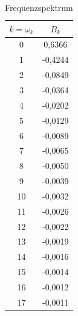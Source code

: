 \documentclass[titlepage = firstcover]{scrartcl}
\begin{document}
    \begin{table}[h]
        \centering
        \caption{Frequenzspektrum}
        \label{tab:Tabelle_2}
        
        \begin{tabular}{c c}
            \toprule
            {$k = \omega_k$} & {$B_k$}\\
            \midrule
            0 &  0,6366 \\
            1 & -0,4244 \\
            2 & -0,0849 \\
            3 & -0,0364 \\
            4 & -0,0202 \\
            5 & -0,0129 \\
            6 & -0,0089 \\
            7 & -0,0065 \\
            8 & -0,0050 \\
            9 & -0,0039 \\
            10 & -0,0032 \\
            11 & -0,0026 \\
            12 & -0,0022 \\
            13 & -0,0019 \\
            14 & -0,0016 \\
            15 & -0,0014 \\
            16 & -0,0012 \\
            17 & -0,0011 \\
            \bottomrule
        \end{tabular}    
    \end{table}
    
\end{document}
